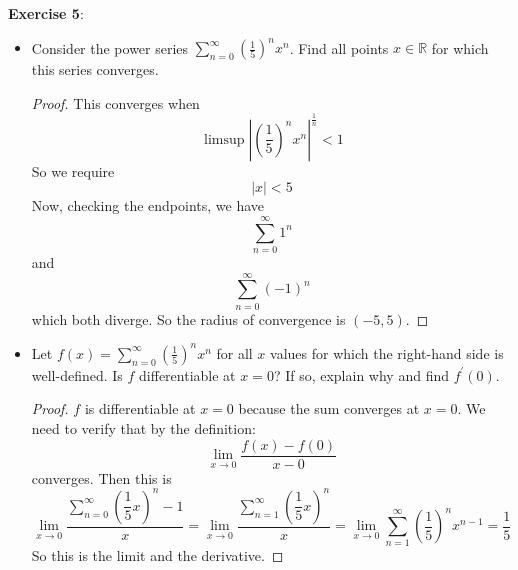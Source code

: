\documentclass{article}
\begin{document}
\textbf{Exercise 5}:
    \begin{itemize}
        \item Consider the power series $\sum_{n = 0}^{\infty}(\frac{1}{5})^{n}x^{n}$. Find all points $x \in\mathbb{R}$ for which this series converges.
            \begin{proof}
                This converges when 
                    \begin{equation*}
                        \limsup \left\lvert \left(\dfrac{1}{5}\right)^{n}x^{n} \right\rvert^{\frac{1}{n}} < 1
                    \end{equation*}
                So we require
                    \begin{equation*}
                        \lvert x \rvert < 5
                    \end{equation*}
                Now, checking the endpoints, we have
                    \begin{equation*}
                        \sum_{n = 0}^{\infty}1^{n}
                    \end{equation*}
                and 
                    \begin{equation*}
                        \sum_{n = 0}^{\infty}(-1)^{n}
                    \end{equation*}
                which both diverge. So the radius of convergence is $(-5, 5)$.
            \end{proof}

        \item Let $f(x) = \sum_{n = 0}^{\infty}(\frac{1}{5})^{n}x^{n}$ for all $x$ values for which the right-hand side is well-defined. Is $f$ differentiable at $x =  0$? If so, explain why and find $f^{\prime}(0)$.
            \begin{proof}
                $f$ is differentiable at $x = 0$ because the sum converges at $x = 0$. We need to verify that by the definition:
                    \begin{equation*}
                        \lim_{x \to 0} \dfrac{f(x) - f(0)}{x - 0}
                    \end{equation*}
                converges. Then this is 
                    \begin{equation*}
                        \lim_{x \to 0} \dfrac{\sum_{n = 0}^{\infty}(\dfrac{1}{5}x)^{n} - 1}{x} = \lim_{x \to 0} \dfrac{\sum_{n = 1}^{\infty}(\dfrac{1}{5}x)^{n}}{x} = \lim_{x \to 0} \sum_{n = 1}^{\infty}(\dfrac{1}{5})^{n}x^{n - 1} = \dfrac{1}{5}
                    \end{equation*}
                So this is the limit and the derivative.
            \end{proof}
    \end{itemize}
\end{document}
